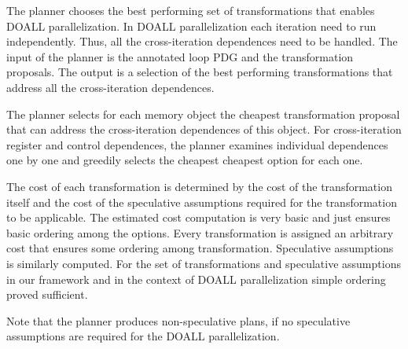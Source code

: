 The planner chooses the best performing set of transformations that
enables DOALL parallelization.
%
In DOALL parallelization each iteration need to run independently.
Thus, all the cross-iteration dependences need to be handled.
%
The input of the planner is the annotated loop PDG and the
transformation proposals.
%
The output is a selection of the best performing transformations that
address all the cross-iteration dependences. 


%
The planner selects for each memory object the cheapest transformation
proposal that can address the cross-iteration dependences of this
object.
%
%
For cross-iteration register and control dependences, the planner
examines individual dependences one by one and greedily selects the
cheapest cheapest option for each one.

The cost of each transformation is determined by the cost of the
transformation itself and the cost of the speculative assumptions
required for the transformation to be applicable. 
%
The estimated cost computation is very basic and just ensures basic
ordering among the options.
%
Every transformation is assigned an arbitrary cost that ensures some
ordering among transformation. Speculative assumptions is similarly
computed.
%
For the set of transformations and speculative assumptions in our
framework and in the context of DOALL parallelization simple ordering
proved sufficient.


Note that the planner produces non-speculative plans, if no speculative
assumptions are required for the DOALL parallelization.

